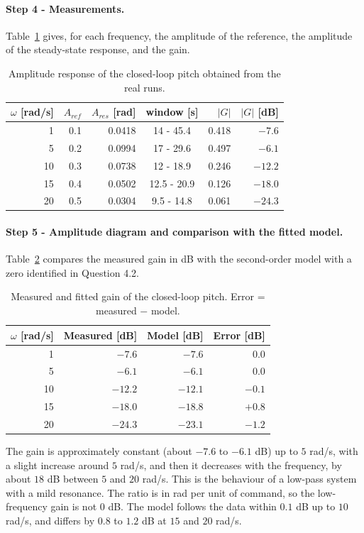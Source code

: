 \paragraph{Step 4 - Measurements.}
Table~\ref{tab:pitch-bode} gives, for each frequency, the amplitude of the reference, the amplitude of the steady-state response, and the gain.
\begin{table}[ht]
\centering
\begin{tabular}{rrrcrr}
\hline
$\omega$ [rad/s] & $A_{ref}$ & $A_{res}$ [rad] & window [s] & $|G|$ & $|G|$ [dB] \\
\hline
1  & 0.1 & 0.0418 & 14 - 45.4   & 0.418 & $-7.6$  \\
5  & 0.2 & 0.0994 & 17 - 29.6   & 0.497 & $-6.1$  \\
10 & 0.3 & 0.0738 & 12 - 18.9   & 0.246 & $-12.2$ \\
15 & 0.4 & 0.0502 & 12.5 - 20.9 & 0.126 & $-18.0$ \\
20 & 0.5 & 0.0304 & 9.5 - 14.8  & 0.061 & $-24.3$ \\
\hline
\end{tabular}
\caption{Amplitude response of the closed-loop pitch obtained from the real runs.}
\label{tab:pitch-bode}
\end{table}

\paragraph{Step 5 - Amplitude diagram and comparison with the fitted model.}
Table~\ref{tab:pitch-bode-fit} compares the measured gain in dB with the second-order model with a zero identified in Question 4.2.
\begin{table}[ht]
\centering
\begin{tabular}{rrrr}
\hline
$\omega$ [rad/s] & Measured [dB] & Model [dB] & Error [dB] \\
\hline
1  & $-7.6$  & $-7.6$  & $0.0$  \\
5  & $-6.1$  & $-6.1$  & $0.0$  \\
10 & $-12.2$ & $-12.1$ & $-0.1$ \\
15 & $-18.0$ & $-18.8$ & $+0.8$ \\
20 & $-24.3$ & $-23.1$ & $-1.2$ \\
\hline
\end{tabular}
\caption{Measured and fitted gain of the closed-loop pitch. Error = measured $-$ model.}
\label{tab:pitch-bode-fit}
\end{table}
The gain is approximately constant (about $-7.6$ to $-6.1$ dB) up to $5$ rad/s, with a slight increase around $5$ rad/s, and then it decreases with the frequency, by about $18$ dB between $5$ and $20$ rad/s.
This is the behaviour of a low-pass system with a mild resonance.
The ratio is in rad per unit of command, so the low-frequency gain is not $0$ dB.
The model follows the data within $0.1$ dB up to $10$ rad/s, and differs by $0.8$ to $1.2$ dB at $15$ and $20$ rad/s.
